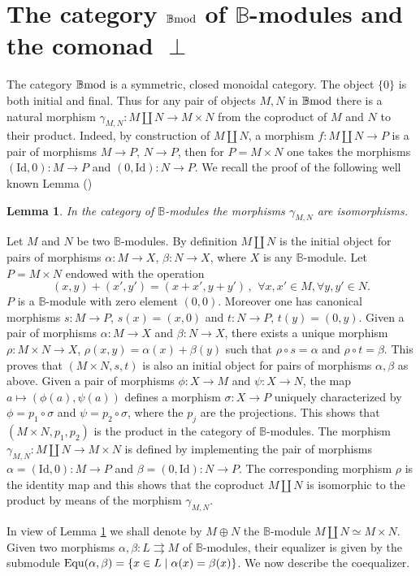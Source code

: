\documentclass[12pt]{article}
\newtheorem{lem}[thm]{Lemma}
\def\id{{\rm id}}
\def\equ{{\rm Equ}}
\def\B{{\mathbb B}}
\def\qqq{\,,\,~\forall}
\def\id{{\mbox{Id}}}
\def\bmod{{\rm \B mod}}
\begin{document}
\section{The category $\bmod$ of $\B$-modules and the comonad $\perp$}\label{sect abstract bmod}

  The category $\bmod$  is a symmetric, closed monoidal category. The object $\{0\}$ is both initial and final. Thus for any pair of objects $M, N$ in $\bmod$ there is  a natural morphism
$
\gamma_{M,N}:M\amalg N\to M\times N
$
from the coproduct of  $M$ and $N$ to their product. Indeed, by  construction of $M\amalg N$, a morphism $f:M\amalg N\to P$ is a pair of morphisms $M\to P$, $N\to P$, then for $P=M\times N$ one takes the morphisms $(\id, 0):M\to P$ and $(0,\id):N\to P$. We recall the proof of the  following well known Lemma (\!\cite{MacLane})
\begin{lem}\label{alab} In the category of $\B$-modules the morphisms $\gamma_{M,N}$ are isomorphisms.	
\end{lem}
\proof Let $M$ and $N$ be two $\B$-modules.  By definition  $M \amalg N$ is the initial object for pairs of morphisms  $\alpha:M\to X$, $\beta:N\to X$, where $X$ is any $\B$-module. Let $P=M\times N$ endowed with the operation 
$$
(x,y)+(x',y')=(x+x',y+y')\qqq x,x'\in M, \forall y,y'\in N.
$$
$P$ is a $\B$-module with zero element  $(0,0)$. Moreover one has canonical morphisms $s:M\to P$, $s(x)=(x, 0)$ and $t:N\to P$, $t(y)=(0,y)$.
 Given a pair of morphisms  $\alpha:M\to X$ and $\beta:N\to X$, there exists a unique morphism   $\rho: M\times N\to X$, $\rho(x,y)= \alpha(x)+\beta(y)$ such that $\rho\circ s=\alpha$ and $\rho\circ t=\beta$. This proves that $(M\times N, s,t)$ is also an initial object for pairs of morphisms $\alpha,\beta$ as above. 
 Given a pair of morphisms $\phi:X\to M$ and $\psi:X\to N$, the map $a\mapsto (\phi(a),\psi(a))$ defines a morphism $\sigma:X\to P$ uniquely characterized by $\phi=p_1\circ \sigma$ and $\psi=p_2\circ \sigma$, where the $p_j$ are the projections. This shows that $(M\times N,p_1,p_2)$ is the product in the category of $\B$-modules.  
 The  morphism $\gamma_{M,N}:M\amalg N\to M\times N$ is defined by implementing the pair of morphisms 
 $\alpha=(\id, 0):M\to P$ and $\beta=(0,\id):N\to P$. The corresponding morphism $\rho$ is the identity map and 
 this shows that the coproduct $M\amalg N$ is isomorphic to the product by means of the morphism $\gamma_{M,N}$.\endproof
 
In view of Lemma \ref{alab} we shall denote by $M\oplus N$ the $\B$-module $M\amalg N\simeq M\times N$. Given two morphisms $\alpha,\beta:L\rightrightarrows M$ of $\B$-modules, their equalizer is given by the submodule $\equ(\alpha,\beta)=\{x\in L\mid \alpha(x)=\beta(x)\}$. We now describe the coequalizer.
\end{document}
